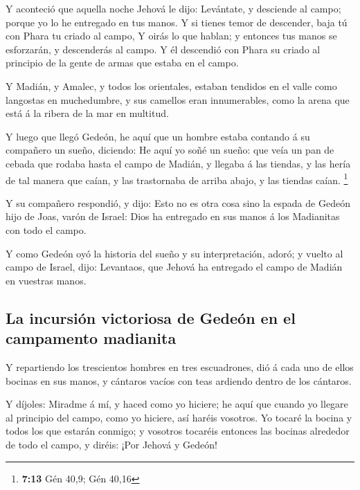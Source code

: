  Y aconteció que aquella noche Jehová le dijo: Levántate,
y desciende al campo; porque yo lo he entregado en tus manos.
 Y si tienes temor de descender, baja tú con Phara tu
criado al campo,  Y oirás lo que hablan; y entonces tus
manos se esforzarán, y descenderás al campo. Y él descendió con Phara su
criado al principio de la gente de armas que estaba en el campo.

 Y Madián, y Amalec, y todos los orientales, estaban
tendidos en el valle como langostas en muchedumbre, y sus camellos eran
innumerables, como la arena que está á la ribera de la mar en multitud.

 Y luego que llegó Gedeón, he aquí que un hombre estaba
contando á su compañero un sueño, diciendo: He aquí yo soñé un sueño:
que veía un pan de cebada que rodaba hasta el campo de Madián, y llegaba
á las tiendas, y las hería de tal manera que caían, y las trastornaba de
arriba abajo, y las tiendas caían. \footnote{\textbf{7:13} Gén 40,9; Gén
  40,16}

 Y su compañero respondió, y dijo: Esto no es otra cosa
sino la espada de Gedeón hijo de Joas, varón de Israel: Dios ha
entregado en sus manos á los Madianitas con todo el campo.

 Y como Gedeón oyó la historia del sueño y su
interpretación, adoró; y vuelto al campo de Israel, dijo: Levantaos, que
Jehová ha entregado el campo de Madián en vuestras manos.

\hypertarget{la-incursiuxf3n-victoriosa-de-gedeuxf3n-en-el-campamento-madianita}{%
\subsection{La incursión victoriosa de Gedeón en el campamento
madianita}\label{la-incursiuxf3n-victoriosa-de-gedeuxf3n-en-el-campamento-madianita}}

 Y repartiendo los trescientos hombres en tres
escuadrones, dió á cada uno de ellos bocinas en sus manos, y cántaros
vacíos con teas ardiendo dentro de los cántaros.

 Y díjoles: Miradme á mí, y haced como yo hiciere; he
aquí que cuando yo llegare al principio del campo, como yo hiciere, así
haréis vosotros.  Yo tocaré la bocina y todos los que
estarán conmigo; y vosotros tocaréis entonces las bocinas alrededor de
todo el campo, y diréis: ¡Por Jehová y Gedeón!

